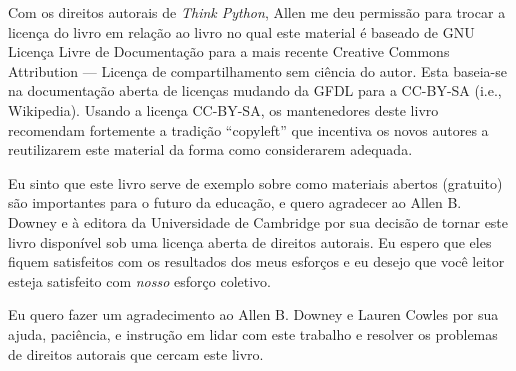 Com os direitos autorais de \emph{Think Python}, Allen me deu permissão para
trocar a licença do livro em relação ao livro no qual este material é baseado
de GNU Licença Livre de Documentação para a mais recente Creative Commons
Attribution --- Licença de compartilhamento sem ciência do autor. Esta
baseia-se na documentação aberta de licenças mudando da GFDL para a CC-BY-SA
(i.e., Wikipedia). Usando a licença CC-BY-SA, os mantenedores deste livro
recomendam fortemente a tradição ``copyleft'' que incentiva os novos autores
a reutilizarem este material da forma como considerarem adequada.


Eu sinto que este livro serve de exemplo sobre como materiais abertos
(gratuito) são importantes para o futuro da educação, e quero agradecer ao
Allen B. Downey e à editora da Universidade de Cambridge por sua decisão de
tornar este livro disponível sob uma licença aberta de direitos autorais. Eu
espero que eles fiquem satisfeitos com os resultados dos meus esforços e eu
desejo que você leitor esteja satisfeito com \emph{nosso} esforço coletivo.


Eu quero fazer um agradecimento ao Allen B. Downey e Lauren Cowles por sua
ajuda, paciência, e instrução em lidar com este trabalho e resolver os
problemas de direitos autorais que cercam este livro.


